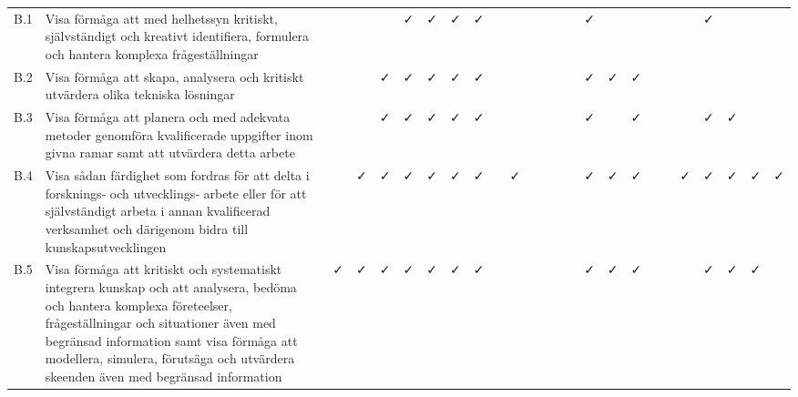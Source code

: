 \begin{sidewaystable}[H]
{\begin{tabular}{lp{16cm}ccccccccccccccccccccccc}
B.1 & Visa förmåga att med helhetssyn kritiskt, självständigt och kreativt identifiera, formulera och hantera komplexa frågeställningar                                                                                                                                                                                   &          &          &          & \faCheck & \faCheck & \faCheck & \faCheck &          &          &          &          &          &          & \faCheck &          &          &          &          &          & \faCheck &          &          & \tabularnewline          
B.2 & Visa förmåga att skapa, analysera och kritiskt utvärdera olika tekniska lösningar                                                                                                                                                                                                                                   &          &          & \faCheck & \faCheck & \faCheck & \faCheck & \faCheck &          &          &          &          &          &          & \faCheck & \faCheck & \faCheck &          &          &          &          &          &          & \tabularnewline          
B.3 & Visa förmåga att planera och med adekvata metoder genomföra kvalificerade uppgifter inom givna ramar samt att utvärdera detta arbete                                                                                                                                                                                &          &          & \faCheck & \faCheck & \faCheck & \faCheck & \faCheck &          &          &          &          &          &          & \faCheck &          & \faCheck &          &          &          & \faCheck & \faCheck &          & \tabularnewline          
B.4 & Visa sådan färdighet som fordras för att delta i forsknings‐ och utvecklings‐ arbete eller för att självständigt arbeta i annan kvalificerad verksamhet och därigenom bidra till kunskapsutvecklingen                                                                                                               &          & \faCheck & \faCheck & \faCheck & \faCheck & \faCheck & \faCheck &          & \faCheck &          &          &          &          & \faCheck & \faCheck & \faCheck &          &          & \faCheck & \faCheck & \faCheck & \faCheck & \faCheck \tabularnewline 
B.5 & Visa förmåga att kritiskt och systematiskt integrera kunskap och att analysera, bedöma och hantera komplexa företeelser, frågeställningar och situationer även med begränsad information samt visa förmåga att modellera, simulera, förutsäga och utvärdera skeenden även med begränsad information                 & \faCheck & \faCheck & \faCheck & \faCheck & \faCheck & \faCheck & \faCheck &          &          &          &          &          &          & \faCheck & \faCheck & \faCheck &          &          &          & \faCheck & \faCheck & \faCheck & \tabularnewline          

\end{tabular}}
\end{sidewaystable}
